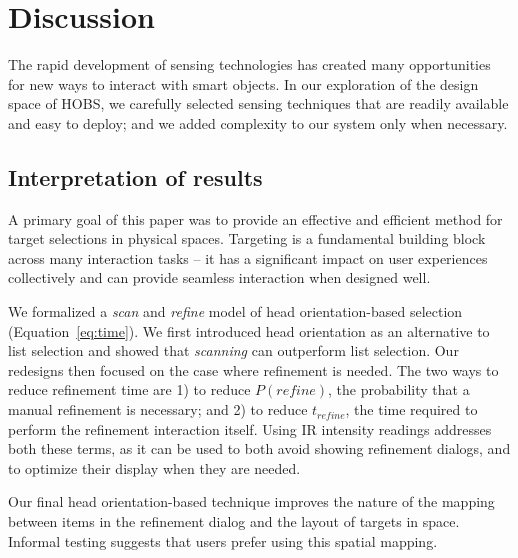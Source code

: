 \section{Discussion}
\label{sec:discussion}
The rapid development of sensing technologies has created many opportunities for new ways to interact with smart objects. In our exploration of the design space of HOBS, we carefully selected sensing techniques that are readily available and easy to deploy; and we added complexity to our system only when necessary. 

\subsection{Interpretation of results}

A primary goal of this paper was to provide an effective and efficient method for target selections in physical spaces. Targeting is a fundamental building block across many interaction tasks -- it has a significant impact on user experiences collectively and can provide seamless interaction when designed well.

We formalized a {\em scan} and {\em refine} model of head orientation-based selection (Equation~\ref{eq:time}). We first introduced head orientation as an alternative to list selection and showed that {\em scanning} can outperform list selection. Our redesigns then focused on the case where refinement is needed. The two ways to reduce refinement time are 1) to reduce $P(refine)$, the probability that a manual refinement is necessary; and 2) to reduce $t_{refine}$, the time required to perform the refinement interaction itself. Using IR intensity readings addresses both these terms, as it can be used to both avoid showing refinement dialogs, and to optimize their display when they are needed. 

Our final head orientation-based technique improves the nature of the mapping between items in the refinement dialog and the layout of targets in space. Informal testing suggests that users prefer using this spatial mapping.


